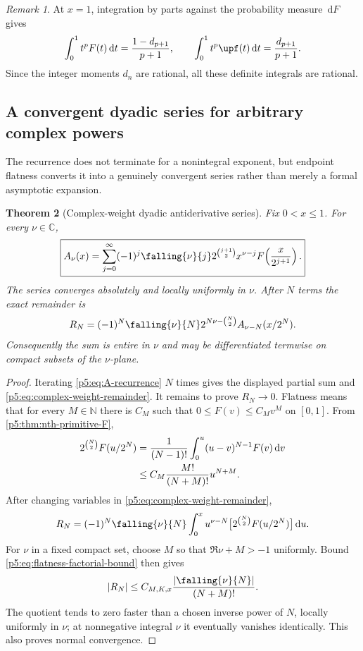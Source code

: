 \documentclass[11pt,oneside]{article}
\newtheorem{theorem}{Theorem}[section]
\theoremstyle{definition}
\theoremstyle{remark}
\newtheorem{remark}[theorem]{Remark}
\newcommand{\C}{\mathbb C}
\newcommand{\N}{\mathbb N}
\newcommand{\dd}{\,\mathrm d}
\newcommand{\1}{\mathbf 1}
\begin{document}
\begin{remark}
At $x=1$, integration by parts against the probability measure $\dd F$ gives
\begin{equation}\label{p5:eq:integer-definite-moment}
 \int_0^1t^pF(t)\dd t=\frac{1-d_{p+1}}{p+1},
 \qquad
 \int_0^1t^p\upf(t)\dd t=\frac{d_{p+1}}{p+1}.
\end{equation}
Since the integer moments $d_n$ are rational, all these definite integrals are rational.
\end{remark}

\subsection{A convergent dyadic series for arbitrary complex powers}

The recurrence does not terminate for a nonintegral exponent, but endpoint flatness converts it into a genuinely convergent series rather than merely a formal asymptotic expansion.

\begin{theorem}[Complex-weight dyadic antiderivative series]\label{p5:thm:complex-weight-series}
Fix $0<x\le1$.  For every $\nu\in\C$,
\begin{equation}\label{p5:eq:complex-weight-series}
\boxed{
 A_\nu(x)=
 \sum_{j=0}^{\infty}(-1)^j\falling{\nu}{j}
 2^{\binom{j+1}{2}}x^{\nu-j}
 F\!\left(\frac{x}{2^{j+1}}\right).}
\end{equation}
The series converges absolutely and locally uniformly in $\nu$.  After $N$ terms the exact remainder is
\begin{equation}\label{p5:eq:complex-weight-remainder}
 R_N=(-1)^N\falling{\nu}{N}
 2^{N\nu-\binom N2}A_{\nu-N}(x/2^N).
\end{equation}
Consequently the sum is entire in $\nu$ and may be differentiated termwise on compact subsets of the $\nu$-plane.
\end{theorem}

\begin{proof}
Iterating \eqref{p5:eq:A-recurrence} $N$ times gives the displayed partial sum and \eqref{p5:eq:complex-weight-remainder}.  It remains to prove $R_N\to0$.  Flatness means that for every $M\in\N$ there is $C_M$ such that $0\le F(v)\le C_Mv^M$ on $[0,1]$.  From \cref{p5:thm:nth-primitive-F},
\begin{align}
 2^{\binom N2}F(u/2^N)
 &=\frac1{(N-1)!}\int_0^u(u-v)^{N-1}F(v)\dd v\notag\\
 &\le C_M\frac{M!}{(N+M)!}u^{N+M}.\label{p5:eq:flatness-factorial-bound}
\end{align}
After changing variables in \eqref{p5:eq:complex-weight-remainder},
\[
 R_N=(-1)^N\falling{\nu}{N}
 \int_0^x u^{\nu-N}
 \bigl[2^{\binom N2}F(u/2^N)\bigr]\dd u.
\]
For $\nu$ in a fixed compact set, choose $M$ so that $\Re\nu+M>-1$ uniformly.  Bound \eqref{p5:eq:flatness-factorial-bound} then gives
\[
 |R_N|\le C_{M,K,x}\frac{|\falling{\nu}{N}|}{(N+M)!}.
\]
The quotient tends to zero faster than a chosen inverse power of $N$, locally uniformly in $\nu$; at nonnegative integral $\nu$ it eventually vanishes identically.  This also proves normal convergence.
\end{proof}
\end{document}
